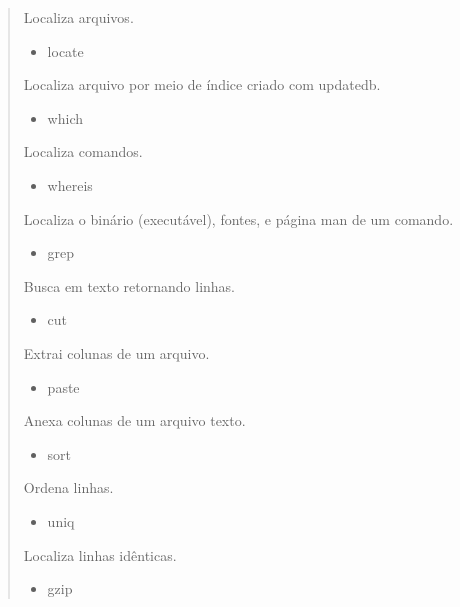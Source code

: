 \documentclass[a4paper,10pt,brazil]{sphinxmanual}
\begin{document}
\begin{quote}
\begin{description}
\begin{itemize}
\end{itemize}

Localiza arquivos.
\begin{itemize}
\item {} 
locate

\end{itemize}

Localiza arquivo por meio de índice criado com updatedb.
\begin{itemize}
\item {} 
which

\end{itemize}

Localiza comandos.
\begin{itemize}
\item {} 
whereis

\end{itemize}

Localiza o binário (executável), fontes, e página man de
um comando.
\begin{itemize}
\item {} 
grep

\end{itemize}

Busca em texto retornando linhas.
\begin{itemize}
\item {} 
cut

\end{itemize}

Extrai colunas de um arquivo.
\begin{itemize}
\item {} 
paste

\end{itemize}

Anexa colunas de um arquivo texto.
\begin{itemize}
\item {} 
sort

\end{itemize}

Ordena linhas.
\begin{itemize}
\item {} 
uniq

\end{itemize}

Localiza linhas idênticas.
\begin{itemize}
\item {} 
gzip

\end{itemize}


\end{description}
\end{quote}
\end{document}
